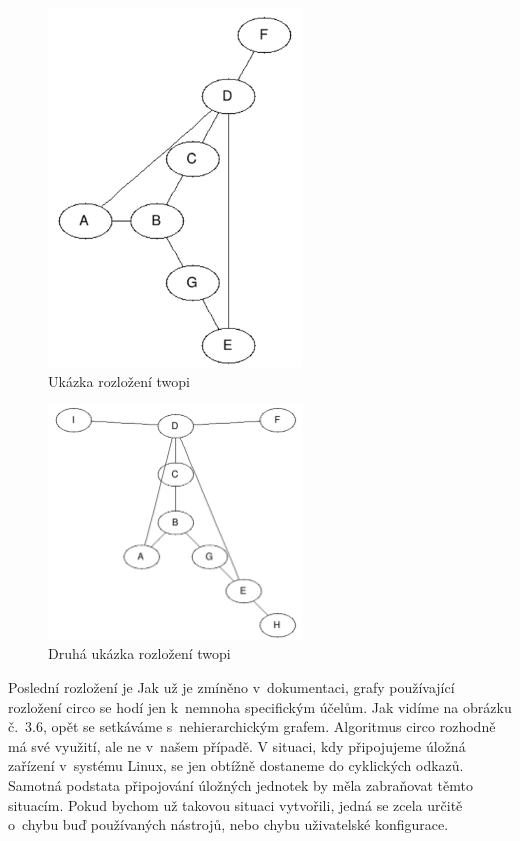 \documentclass[printed,color,table,oneside,nolot,nolof]{fithesis}
\begin{document}
\begin{figure}[h!]
	\label{fig:Ukázka rozložení twopi}
	\caption{Ukázka rozložení twopi}
	\centering
	\includegraphics[width=0.6\textwidth]{pictures/twopi_example.png} 
\end{figure}
\begin{figure}
	\label{fig:Ukázka rozložení twopi}
	\caption{Druhá ukázka rozložení twopi}
	\centering
	\includegraphics[width=0.6\textwidth]{pictures/twopi_example_2.png} 
\end{figure}

	Poslední rozložení je \cite{graphviz_layout} 
	Jak už je zmíněno v~dokumentaci, grafy používající rozložení 
	circo se hodí jen k~nemnoha specifickým účelům. Jak vidíme na obrázku č.~3.6, opět se setkáváme s~nehierarchickým grafem. Algoritmus circo rozhodně má své využití, ale ne v~našem případě. V
	situaci, kdy připojujeme úložná zařízení v~systému Linux, se jen obtížně dostaneme do cyklických odkazů. Samotná podstata připojování úložných jednotek by měla zabraňovat těmto
	situacím. Pokud bychom už takovou situaci vytvořili, jedná se zcela určitě o~chybu buď používaných nástrojů, nebo chybu uživatelské konfigurace. 
\end{document}
